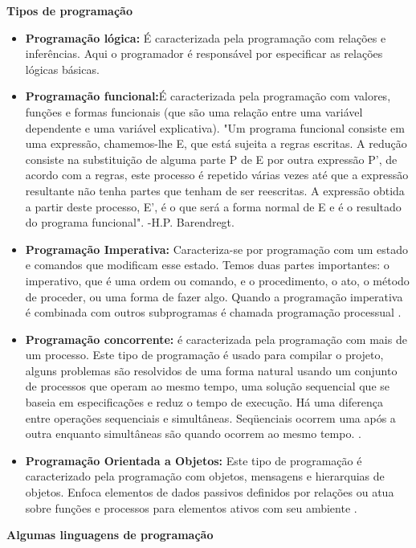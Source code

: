 \documentclass[11pt, letterpaper, portuguese]{article}
\begin{document}
   
   \textbf{Tipos de programação}
   \begin{itemize}
       \item{\textbf{Programação lógica:} É caracterizada pela programação com relações e inferências. Aqui o programador é responsável por especificar as relações lógicas básicas.}
       \item{\textbf{Programação funcional:}É caracterizada pela programação com valores, funções e formas funcionais (que são uma relação entre uma variável dependente e uma variável explicativa). "Um programa funcional consiste em uma expressão, chamemos-lhe E, que está sujeita a regras escritas. A redução consiste na substituição de alguma parte P de E por outra expressão P', de acordo com a regras, este processo é repetido várias vezes até que a expressão resultante não tenha partes que tenham de ser reescritas. A expressão obtida a partir deste processo, E', é o que será a forma normal de E e é o resultado do programa funcional". -H.P. Barendregt.}
       \item{\textbf{Programação Imperativa:} Caracteriza-se por programação com um estado e comandos que modificam esse estado. Temos duas partes importantes: o imperativo, que é uma ordem ou comando, e o procedimento, o ato, o método de proceder, ou uma forma de fazer algo. Quando a programação imperativa é combinada com outros subprogramas é chamada programação processual  \cite{garfinkel_shevtsov_guo_2017}.}
      \item{\textbf{Programação concorrente:} é caracterizada pela programação com mais de um processo. Este tipo de programação é usado para compilar o projeto, alguns problemas são resolvidos de uma forma natural usando um conjunto de processos que operam ao mesmo tempo, uma solução sequencial que se baseia em especificações e reduz o tempo de execução. Há uma diferença entre operações sequenciais e simultâneas. Seqüenciais ocorrem uma após a outra enquanto simultâneas são quando ocorrem ao mesmo tempo.  \cite{garfinkel_shevtsov_guo_2017}.} \item{\textbf{Programação Orientada a Objetos:} Este tipo de programação é caracterizado pela programação com objetos, mensagens e hierarquias de objetos. Enfoca elementos de dados passivos definidos por relações ou atua sobre funções e processos para elementos ativos com seu ambiente  \cite{garfinkel_shevtsov_guo_2017}.} \end{itemize} 
      \textbf{Algumas linguagens de programação} 
\end{document}
